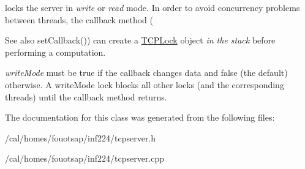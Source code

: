 locks the server in {\itshape write} or {\itshape read} mode. In order to avoid concurrency problems between threads, the callback method ( 

\begin{DoxySeeAlso}{See also}
set\+Callback()) can create a \hyperlink{classcppu_1_1_t_c_p_lock}{T\+C\+P\+Lock} object {\itshape in the stack} before performing a computation.
\end{DoxySeeAlso}
{\itshape write\+Mode} must be true if the callback changes data and false (the default) otherwise. A write\+Mode lock blocks all other locks (and the corresponding threads) until the callback method returns. 

The documentation for this class was generated from the following files\+:\begin{DoxyCompactItemize}
\item 
/cal/homes/fouotsap/inf224/tcpserver.\+h\item 
/cal/homes/fouotsap/inf224/tcpserver.\+cpp\end{DoxyCompactItemize}

